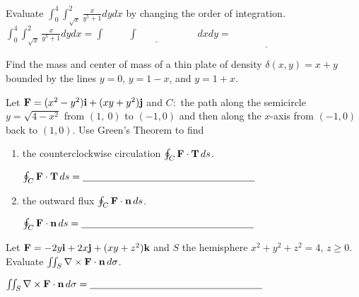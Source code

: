 \documentclass[12pt]{exam}
\newcommand{\ve}[1]{{\bf #1}}
\begin{document}
\begin{questions}
\question[15] Evaluate 
$\displaystyle\int_0^4\int_{\sqrt{x}}^2\frac{x}{y^5+1}dydx$
by changing the order of integration.
\vfill
$\displaystyle\int_0^4\int_{\sqrt{x}}^2\frac{x}{y^5+1}dydx
=\underline{\int\hspace{1cm}\int\hspace{1in}dxdy}
=\underline{\phantom{\int}\hspace{1in}}$
\newpage

\question[15] Find the mass and center of mass of a
thin plate of density $\delta(x,y)=x+y$
bounded by the lines $y=0$, $y=1-x$, and $y=1+x$.
\vfill
{}
\newpage

\question[15] Let $\ve{F}=(x^2-y^2)\ve{i}+(xy+y^2)\ve{j}$ and $C:$ the path along the semicircle $y = \sqrt{4- x^2}$ from $(1,\ 0)$ to $(-1,0)$ and then along the
$x$-axis from $(-1,0)$  back to $(1,0)$. Use Green's Theorem to find

\begin{enumerate}
\item the counterclockwise circulation $\oint_C\ve{F}\cdot\ve{T}\,ds$.\vskip3.5in

\hskip2in $\oint_C\ve{F}\cdot\ve{T}\,ds=\underline{\phantom{aaaaaaaaaaaaaaaaaaaaaaaaaaaaaaaaa}}$
\item  the outward flux $\oint_C\ve{F}\cdot\ve{n}\,ds$.\vskip3.5in

\hskip2in $\oint_C\ve{F}\cdot\ve{n}\,ds=\underline{\phantom{aaaaaaaaaaaaaaaaaaaaaaaaaaaaaaaaa}}$
\end{enumerate}


\addpoints

\newpage

\question[15] Let $\ve{F}=-2y\ve{i}+2x\ve{j}+(xy+z^2)\ve{k}$ and $S$  the hemisphere $x^2+y^2+z^2=4$, $z\ge 0$. Evaluate $\iint_S\nabla\times \ve{F}\cdot\ve{n}\,d\sigma$.\vskip8in


\hskip3in $\iint_S\nabla\times \ve{F}\cdot\ve{n}\,d\sigma=\underline{\phantom{aaaaaaaaaaaaaaaaaaaaaaaaaaaaaaaaa}}$

\addpoints

\end{questions}
\end{document}
